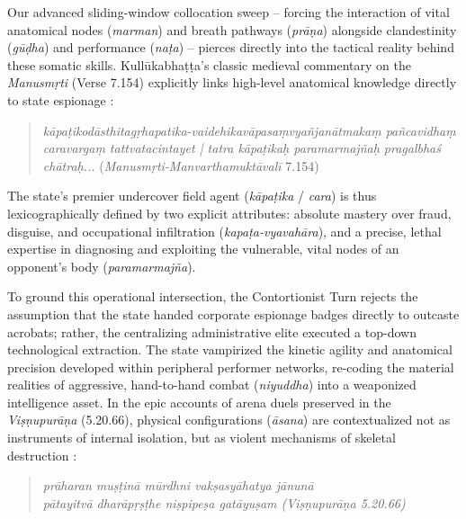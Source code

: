 \documentclass[11pt,twoside,letterpaper]{article}
\begin{document}
Our advanced sliding-window collocation sweep – forcing the interaction of vital anatomical nodes (\textit{marman}) and breath pathways (\textit{pr\={a}\d{n}a}) alongside clandestinity (\textit{g\={u}\d{d}ha}) and performance (\textit{na\d{t}a}) – pierces directly into the tactical reality behind these somatic skills. Kull\={u}kabha\d{t}\d{t}a’s classic medieval commentary on the \textit{Manusm\d{r}ti} (Verse 7.154) explicitly links high-level anatomical knowledge directly to state espionage \citep{GRETIL_vcp}:

\begin{quote}
\textit{k\={a}pa\d{t}ikod\={a}sthitag\d{r}hapatika-vaidehikav\={a}pasa\d{m}vya\~{n}jan\={a}tmaka\d{m} pa\~{n}cavidha\d{m} caravarga\d{m} tattvatacintayet | tatra k\={a}pa\d{t}ika\d{h} paramarmaj\~{n}a\d{h} pragalbha\'s ch\={a}tra\d{h}...} (\textit{Manusm\d{r}ti-Manvarthamukt\={a}val\={i}} 7.154)
\end{quote}

The state’s premier undercover field agent (\textit{k\={a}pa\d{t}ika} / \textit{cara}) is thus lexicographically defined by two explicit attributes: absolute mastery over fraud, disguise, and occupational infiltration (\textit{kapa\d{t}a-vyavah\={a}ra}), and a precise, lethal expertise in diagnosing and exploiting the vulnerable, vital nodes of an opponent’s body (\textit{paramarmaj\~{n}a}).

To ground this operational intersection, the Contortionist Turn rejects the assumption that the state handed corporate espionage badges directly to outcaste acrobats; rather, the centralizing administrative elite executed a top-down technological extraction. The state vampirized the kinetic agility and anatomical precision developed within peripheral performer networks, re-coding the material realities of aggressive, hand-to-hand combat (\textit{niyuddha}) into a weaponized intelligence asset. In the epic accounts of arena duels preserved in the \textit{Vi\d{s}\d{n}upur\={a}\d{n}a} (5.20.66), physical configurations (\textit{\={a}sana}) are contextualized not as instruments of internal isolation, but as violent mechanisms of skeletal destruction \citep{ViP_5}:

\begin{quote}
\small
\noindent\textit{pr\={a}haran mu\d{s}\d{t}in\={a} m\={u}rdhni vak\d{s}asy\={a}hatya j\={a}nun\={a} \\}
\noindent\textit{p\={a}tayitv\={a} dhar\={a}p\d{r}\d{s}\d{t}he ni\d{s}pipe\d{s}a gat\={a}yu\d{s}am (Vi\d{s}\d{n}upur\={a}\d{n}a 5.20.66)}
\end{quote}
\end{document}
